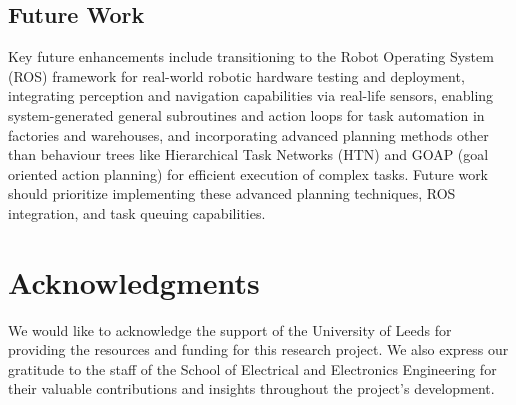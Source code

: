 \documentclass[pdflatex,sn-mathphys-num]{sn-jnl}
\theoremstyle{thmstyleone}
\theoremstyle{thmstyletwo}%
\theoremstyle{thmstylethree}%
\begin{document}
\subsection{Future Work}
Key future enhancements include transitioning to the Robot Operating System (ROS) framework for real-world robotic hardware testing and deployment, integrating perception and navigation capabilities via real-life sensors, enabling system-generated general subroutines and action loops for task automation in factories and warehouses, and incorporating advanced planning methods other than behaviour trees like Hierarchical Task Networks (HTN) and GOAP (goal oriented action planning) for efficient execution of complex tasks. Future work should prioritize implementing these advanced planning techniques, ROS integration, and task queuing capabilities.



\section*{Acknowledgments}
We would like to acknowledge the support of the University of Leeds for providing the resources and funding for this research project. We also express our gratitude to the staff of the School of Electrical and Electronics Engineering for their valuable contributions and insights throughout the project's development.










\end{document}

